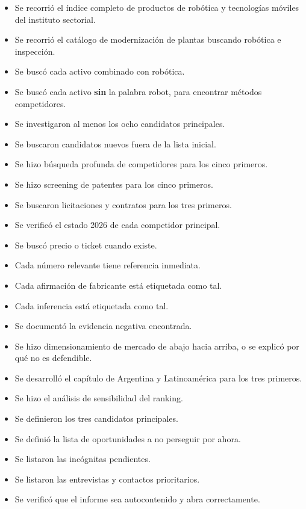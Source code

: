 \documentclass[11pt,a4paper]{article}
\begin{document}
\begin{itemize}[label=$\square$,leftmargin=1.6em]
\item Se recorrió el índice completo de productos de robótica y tecnologías móviles del instituto sectorial.
\item Se recorrió el catálogo de modernización de plantas buscando robótica e inspección.
\item Se buscó cada activo combinado con robótica.
\item Se buscó cada activo \textbf{sin} la palabra robot, para encontrar métodos competidores.
\item Se investigaron al menos los ocho candidatos principales.
\item Se buscaron candidatos nuevos fuera de la lista inicial.
\item Se hizo búsqueda profunda de competidores para los cinco primeros.
\item Se hizo screening de patentes para los cinco primeros.
\item Se buscaron licitaciones y contratos para los tres primeros.
\item Se verificó el estado 2026 de cada competidor principal.
\item Se buscó precio o ticket cuando existe.
\item Cada número relevante tiene referencia inmediata.
\item Cada afirmación de fabricante está etiquetada como tal.
\item Cada inferencia está etiquetada como tal.
\item Se documentó la evidencia negativa encontrada.
\item Se hizo dimensionamiento de mercado de abajo hacia arriba, o se explicó por qué no es defendible.
\item Se desarrolló el capítulo de Argentina y Latinoamérica para los tres primeros.
\item Se hizo el análisis de sensibilidad del ranking.
\item Se definieron los tres candidatos principales.
\item Se definió la lista de oportunidades a no perseguir por ahora.
\item Se listaron las incógnitas pendientes.
\item Se listaron las entrevistas y contactos prioritarios.
\item Se verificó que el informe sea autocontenido y abra correctamente.
\end{itemize}
\end{document}

